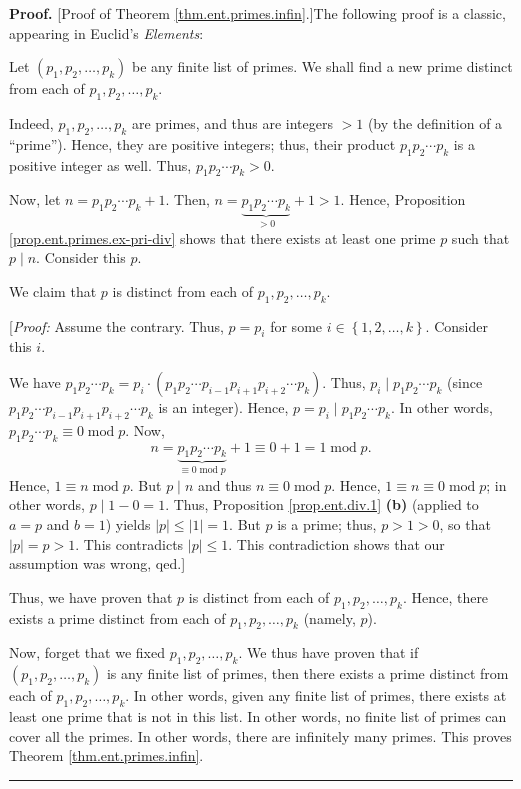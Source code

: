\documentclass[numbers=enddot,12pt,final,onecolumn,notitlepage]{scrartcl}%
\numberwithin{exer}{subsection}
\theoremstyle{definition}
\newenvironment{proof}[1][Proof]{\noindent\textbf{#1.} }{\ \rule{0.5em}{0.5em}}
\begin{document}
\begin{proof}
[Proof of Theorem \ref{thm.ent.primes.infin}.]The following proof is a
classic, appearing in Euclid's \textit{Elements}:

Let $\left(  p_{1},p_{2},\ldots,p_{k}\right)  $ be any finite list of primes.
We shall find a new prime distinct from each of $p_{1},p_{2},\ldots,p_{k}$.

Indeed, $p_{1},p_{2},\ldots,p_{k}$ are primes, and thus are integers $>1$ (by
the definition of a \textquotedblleft prime\textquotedblright). Hence, they
are positive integers; thus, their product $p_{1}p_{2}\cdots p_{k}$ is a
positive integer as well. Thus, $p_{1}p_{2}\cdots p_{k}>0$.

Now, let $n=p_{1}p_{2}\cdots p_{k}+1$. Then, $n=\underbrace{p_{1}p_{2}\cdots
p_{k}}_{>0}+1>1$. Hence, Proposition \ref{prop.ent.primes.ex-pri-div} shows
that there exists at least one prime $p$ such that $p\mid n$. Consider this
$p$.

We claim that $p$ is distinct from each of $p_{1},p_{2},\ldots,p_{k}$.

[\textit{Proof:} Assume the contrary. Thus, $p=p_{i}$ for some $i\in\left\{
1,2,\ldots,k\right\}  $. Consider this $i$.

We have $p_{1}p_{2}\cdots p_{k}=p_{i}\cdot\left(  p_{1}p_{2}\cdots
p_{i-1}p_{i+1}p_{i+2}\cdots p_{k}\right)  $. Thus, $p_{i}\mid p_{1}p_{2}\cdots
p_{k}$ (since $p_{1}p_{2}\cdots p_{i-1}p_{i+1}p_{i+2}\cdots p_{k}$ is an
integer). Hence, $p=p_{i}\mid p_{1}p_{2}\cdots p_{k}$. In other words,
$p_{1}p_{2}\cdots p_{k}\equiv0\operatorname{mod}p$. Now,%
\[
n=\underbrace{p_{1}p_{2}\cdots p_{k}}_{\equiv0\operatorname{mod}p}%
+1\equiv0+1=1\operatorname{mod}p.
\]
Hence, $1\equiv n\operatorname{mod}p$. But $p\mid n$ and thus $n\equiv
0\operatorname{mod}p$. Hence, $1\equiv n\equiv0\operatorname{mod}p$; in other
words, $p\mid1-0=1$. Thus, Proposition \ref{prop.ent.div.1} \textbf{(b)}
(applied to $a=p$ and $b=1$) yields $\left\vert p\right\vert \leq\left\vert
1\right\vert =1$. But $p$ is a prime; thus, $p>1>0$, so that $\left\vert
p\right\vert =p>1$. This contradicts $\left\vert p\right\vert \leq1$. This
contradiction shows that our assumption was wrong, qed.]

Thus, we have proven that $p$ is distinct from each of $p_{1},p_{2}%
,\ldots,p_{k}$. Hence, there exists a prime distinct from each of $p_{1}%
,p_{2},\ldots,p_{k}$ (namely, $p$).

Now, forget that we fixed $p_{1},p_{2},\ldots,p_{k}$. We thus have proven that
if $\left(  p_{1},p_{2},\ldots,p_{k}\right)  $ is any finite list of primes,
then there exists a prime distinct from each of $p_{1},p_{2},\ldots,p_{k}$. In
other words, given any finite list of primes, there exists at least one prime
that is not in this list. In other words, no finite list of primes can cover
all the primes. In other words, there are infinitely many primes. This proves
Theorem \ref{thm.ent.primes.infin}.
\end{proof}
\end{document}
